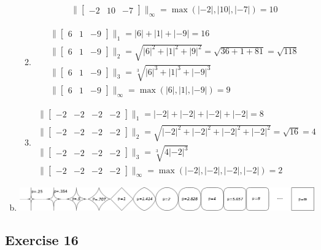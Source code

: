 \documentclass[11pt]{article}
\begin{document}
\begin{enumerate}[a.]
\begin{enumerate}
$$\begin{array}{l}
\|
\begin{bmatrix}
-2 & 10 & -7
\end{bmatrix}\|_\infty = \max(|-2|, |10|, |-7|) = 10
\end{array}
$$
	\item %
$$
\begin{array}{l}
\|
\begin{bmatrix}
6 & 1 & -9
\end{bmatrix}\|_1 = |6| + |1| + |-9| = 16 \\
\|
\begin{bmatrix}
6 & 1 & -9
\end{bmatrix}\|_2 = \sqrt{|6|^2+|1|^2+|9|^2}=\sqrt{36+1+81}=\sqrt{118}\\
\|
\begin{bmatrix}
6 & 1 & -9
\end{bmatrix}\|_3 = \sqrt[3]{|6|^3+|1|^3+|-9|^3} \\
\|
\begin{bmatrix}
6 & 1 & -9
\end{bmatrix}\|_\infty = \max(|6|, |1|, |-9|) = 9
\end{array}
$$
	\item %
$$
\begin{array}{l}
\|
\begin{bmatrix}
-2 & -2 & -2 & -2
\end{bmatrix}\|_1 = |-2| + |-2| + |-2| + |-2| = 8 \\
\|
\begin{bmatrix}
-2 & -2 & -2 & -2
\end{bmatrix}\|_2 = \sqrt{|-2|^2+|-2|^2+|-2|^2+|-2|^2}=\sqrt{16}= 4 \\
\|
\begin{bmatrix}
-2 & -2 & -2 & -2
\end{bmatrix}\|_3 = \sqrt[3]{4|-2|^3} \\
\|
\begin{bmatrix}
-2 & -2 & -2 & -2
\end{bmatrix}\|_\infty = \max(|-2|, |-2|, |-2|, |-2|) = 2
\end{array}
$$
\end{enumerate}
	\item %
	\includegraphics[width=\textwidth]{unit_circles}
\end{enumerate}

\subsection{Exercise 16}
\end{document}
